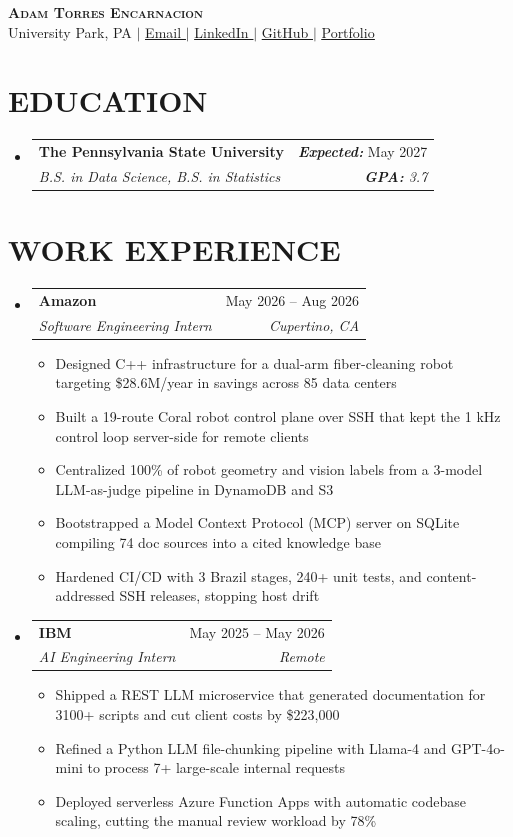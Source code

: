 \documentclass[letterpaper,11pt]{article}
\makeatletter
\newcommand{\resumeItem}[1]{
  \item\small{
    {#1 \vspace{-4pt}}
  }
}
\newcommand{\resumeSubheading}[4]{
  \item
    \begin{tabular*}{0.97\textwidth}[t]{l@{\extracolsep{\fill}}r}
      \textbf{#1} & #2 \\
      \textit{\small#3} & \textit{\small #4} \\
    \end{tabular*}\vspace{-7pt}
}
\newcommand{\resumeSubHeadingListStart}{\begin{itemize}[leftmargin=0.15in, label={}]}
\newcommand{\resumeSubHeadingListEnd}{\end{itemize}}
\newcommand{\resumeItemListStart}{\begin{itemize}}
\newcommand{\resumeItemListEnd}{\end{itemize}\vspace{-6pt}}
\makeatother
\begin{document}
\begin{center}
    \textbf{\Huge \scshape Adam Torres Encarnacion} \\ \vspace{1pt}
    \small University Park, PA $|$ \href{mailto:art5809@psu.edu}{\underline{Email \faEnvelope}} $|$
    \href{https://www.linkedin.com/in/adam-torres-encarnacion/}{\underline{LinkedIn \faLinkedin}} $|$
    \href{https://github.com/0xABAN}{\underline{GitHub \faGithub}} $|$
    \href{https://advm.dev/}{\underline{Portfolio \raisebox{-0.12em}{\scalebox{1.45}{$\blacktriangle$}}}}
\end{center}


\section{\textbf{EDUCATION}}
  \resumeSubHeadingListStart
    \resumeSubheading
    {The Pennsylvania State University}{\textbf{\textit{Expected:}} May 2027}
      {B.S. in Data Science, B.S. in Statistics}{\textbf{\textit{GPA:}} 3.7}
  \resumeSubHeadingListEnd

\section{\textbf{WORK EXPERIENCE}}
  \resumeSubHeadingListStart
  \resumeSubheading
      {Amazon}{May 2026 -- Aug 2026}
      {Software Engineering Intern}{Cupertino, CA}
      \resumeItemListStart
        \resumeItem{Designed C++ infrastructure for a dual-arm fiber-cleaning robot targeting \$28.6M/year in savings across 85 data centers}
        \resumeItem{Built a 19-route Coral robot control plane over SSH that kept the 1 kHz control loop server-side for remote clients}
        \resumeItem{Centralized 100\% of robot geometry and vision labels from a 3-model LLM-as-judge pipeline in DynamoDB and S3}
        \resumeItem{Bootstrapped a Model Context Protocol (MCP) server on SQLite compiling 74 doc sources into a cited knowledge base}
        \resumeItem{Hardened CI/CD with 3 Brazil stages, 240+ unit tests, and content-addressed SSH releases, stopping host drift}
      \resumeItemListEnd
    \resumeSubheading
      {IBM}{May 2025 -- May 2026}
      {AI Engineering Intern}{Remote}
      \resumeItemListStart
        \resumeItem{Shipped a REST LLM microservice that generated documentation for 3100+ scripts and cut client costs by \$223,000}
        \resumeItem{Refined a Python LLM file-chunking pipeline with Llama-4 and GPT-4o-mini to process 7+ large-scale internal requests}
        \resumeItem{Deployed serverless Azure Function Apps with automatic codebase scaling, cutting the manual review workload by 78\%}
      \resumeItemListEnd
  \resumeSubHeadingListEnd
\end{document}
